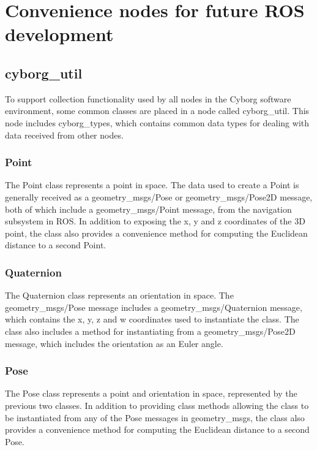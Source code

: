 \documentclass[\rootfolder/main.tex]{subfiles}
\begin{document}
\section{Convenience nodes for future ROS development}

\subsection{cyborg\_util}

To support collection functionality used by all nodes in the Cyborg software environment, some common classes are placed in a node called cyborg\_util.
This node includes cyborg\_types, which contains common data types for dealing with data received from other nodes.

\subsubsection{Point}

The Point class represents a point in space.
The data used to create a Point is generally received as a geometry\_msgs/Pose or geometry\_msgs/Pose2D message, both of which include a geometry\_msgs/Point message, from the navigation subsystem in ROS.
In addition to exposing the x, y and z coordinates of the 3D point, the class also provides a convenience method for computing the Euclidean distance to a second Point.

\subsubsection{Quaternion}

The Quaternion class represents an orientation in space.
The geometry\_msgs/Pose message includes a geometry\_msgs/Quaternion message, which contains the x, y, z and w coordinates used to instantiate the class.
The class also includes a method for instantiating from a geometry\_msgs/Pose2D message, which includes the orientation as an Euler angle.

\subsubsection{Pose}

The Pose class represents a point and orientation in space, represented by the previous two classes.
In addition to providing class methods allowing the class to be instantiated from any of the Pose messages in geometry\_msgs, the class also provides a convenience method for computing the Euclidean distance to a second Pose.
\end{document}

